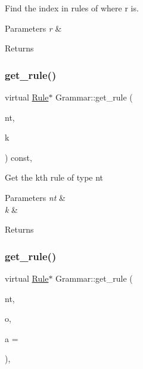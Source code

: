 Find the index in rules of where r is. 
\begin{DoxyParams}{Parameters}
{\em r} & \\
\hline
\end{DoxyParams}
\begin{DoxyReturn}{Returns}

\end{DoxyReturn}
\mbox{\label{class_grammar_aea24b7ae4a2d61f322504a9f49478bb4}} 
\subsubsection{\texorpdfstring{get\+\_\+rule()}{get\_rule()}\hspace{0.1cm}{\footnotesize\ttfamily [1/5]}}
{\footnotesize\ttfamily virtual \hyperlink{class_rule}{Rule}$\ast$ Grammar\+::get\+\_\+rule (\begin{DoxyParamCaption}\item[{const nonterminal\+\_\+t}]{nt,  }\item[{size\+\_\+t}]{k }\end{DoxyParamCaption}) const\hspace{0.3cm}{\ttfamily [inline]}, {\ttfamily [virtual]}}

Get the k\textquotesingle{}th rule of type nt 
\begin{DoxyParams}{Parameters}
{\em nt} & \\
\hline
{\em k} & \\
\hline
\end{DoxyParams}
\begin{DoxyReturn}{Returns}

\end{DoxyReturn}
\mbox{\label{class_grammar_aa642e370571830772b8d3be70cb5a5c7}} 
\subsubsection{\texorpdfstring{get\+\_\+rule()}{get\_rule()}\hspace{0.1cm}{\footnotesize\ttfamily [2/5]}}
{\footnotesize\ttfamily virtual \hyperlink{class_rule}{Rule}$\ast$ Grammar\+::get\+\_\+rule (\begin{DoxyParamCaption}\item[{const nonterminal\+\_\+t}]{nt,  }\item[{const \hyperlink{_instruction_8h_a3a20ca4a8f0ab220518b030cc23ffee4}{Custom\+Op}}]{o,  }\item[{const int}]{a = {} }\end{DoxyParamCaption})\hspace{0.3cm}{\ttfamily [inline]}, {\ttfamily [virtual]}}

